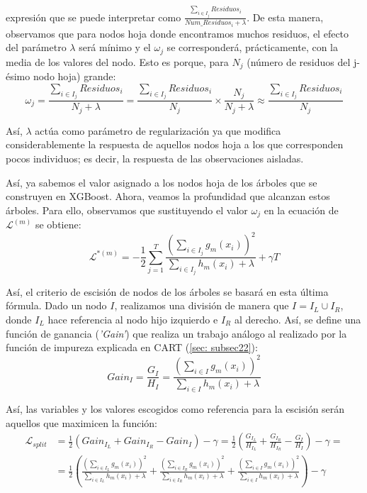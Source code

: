 \documentclass[12pt,twoside]{article}
\begin{document}
\noindent
expresión que se puede interpretar como $\frac{\sum_{i \in I_j} Residuos_i}{Num\_Residuos_i + \lambda}$. De esta manera, observamos que para nodos hoja donde encontramos muchos residuos, el efecto del parámetro $\lambda$ será mínimo y el $\omega_j$ se corresponderá, prácticamente, con la media de los valores del nodo. Esto es porque, para $N_j$ (número de residuos del j-ésimo nodo hoja) grande:
\begin{equation*}
\omega_j = \frac{\sum_{i \in I_j} Residuos_i}{N_j + \lambda} = \frac{\sum_{i \in I_j} Residuos_i}{N_j} \times \frac{N_j}{N_j + \lambda} \approx \frac{\sum_{i \in I_j} Residuos_i}{N_j}
\end{equation*}

Así, $\lambda$ actúa como parámetro de regularización ya que modifica considerablemente la respuesta de aquellos nodos hoja a los que corresponden pocos individuos; es decir, la respuesta de las observaciones aisladas.

Así, ya sabemos el valor asignado a los nodos hoja de los árboles que se construyen en XGBoost. Ahora, veamos la profundidad que alcanzan estos árboles. Para ello, observamos que sustituyendo el valor $\omega_j$ en la ecuación de $\mathcal{L}^{(m)}$ se obtiene:
\begin{equation*}
\mathcal{L}^{*(m)} = - \frac{1}{2} \sum_{j = 1}^T \frac{\left( \sum_{i \in I_j} g_m(x_i) \right)^2}{\sum_{i \in I_j} h_m(x_i) + \lambda} + \gamma T 
\end{equation*}

Así, el criterio de escisión de nodos de los árboles se basará en esta última fórmula. Dado un nodo $I$, realizamos una división de manera que $I = I_L \cup I_R$, donde $I_L$ hace referencia al nodo hijo izquierdo e $I_R$ al derecho. Así, se define una función de ganancia (\textit{'Gain'}) que realiza un trabajo análogo al realizado por la función de impureza explicada en CART (\ref{sec: subsec22}):
\begin{equation*}
Gain_I = \frac{G_I}{H_I} = \frac{\left( \sum_{i \in I} g_m(x_i) \right)^2}{\sum_{i \in I} h_m(x_i) + \lambda}
\end{equation*}

Así, las variables y los valores escogidos como referencia para la escisión serán aquellos que maximicen la función:
\begin{equation*}
\begin{split}
\mathcal{L}_{split} &= \frac{1}{2} \left( Gain_{I_L} + Gain_{I_R} - Gain_{I} \right) - \gamma = \frac{1}{2} \left( \frac{G_{I_L}}{H_{I_L}} + \frac{G_{I_R}}{H_{I_R}} - \frac{G_I}{H_I} \right) - \gamma = \\
&= \frac{1}{2} \left( \frac{\left( \sum_{i \in I_L} g_m(x_i) \right)^2}{\sum_{i \in I_L} h_m(x_i) + \lambda} + \frac{\left( \sum_{i \in I_R} g_m(x_i) \right)^2}{\sum_{i \in I_R} h_m(x_i) + \lambda} + \frac{\left( \sum_{i \in I} g_m(x_i) \right)^2}{\sum_{i \in I} h_m(x_i) + \lambda} \right)   - \gamma
\end{split}
\end{equation*}
\end{document}
